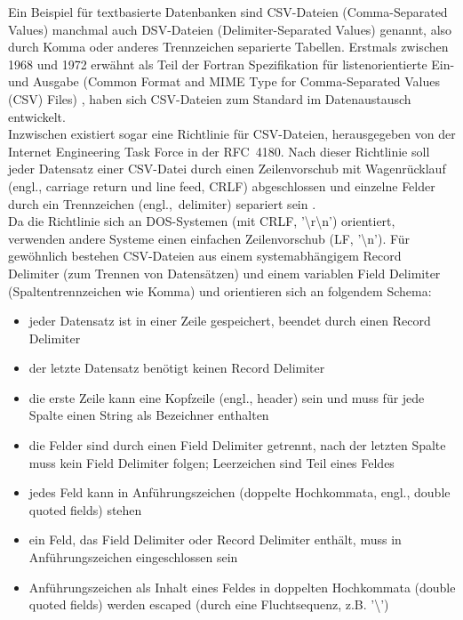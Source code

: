 
Ein Beispiel für textbasierte Datenbanken sind CSV-Dateien (Comma-Separated Values) manchmal auch DSV-Dateien (Delimiter-Separated Values) genannt, also durch Komma oder anderes Trennzeichen separierte Tabellen. Erstmals zwischen 1968 und 1972 erwähnt als Teil der Fortran Spezifikation für listenorientierte Ein- und Ausgabe (Common Format and MIME Type for Comma-Separated Values (CSV) Files) \cite[S. 17]{IBM_Fortran}, haben sich CSV-Dateien zum Standard im Datenaustausch entwickelt.\\

Inzwischen existiert sogar eine Richtlinie für CSV-Dateien, herausgegeben von der Internet Engineering Task Force in der RFC\ 4180. Nach dieser Richtlinie soll jeder Datensatz einer CSV-Datei durch einen Zeilenvorschub mit Wagenrücklauf (engl., carriage return und line feed, CRLF) abgeschlossen und einzelne Felder durch ein Trennzeichen (engl.,\ delimiter) separiert sein \cite{RFC}.\\

Da die Richtlinie sich an DOS-Systemen (mit CRLF, '\textbackslash r\textbackslash n') orientiert, verwenden andere Systeme einen einfachen Zeilenvorschub (LF, '\textbackslash n'). Für gewöhnlich bestehen CSV-Dateien aus einem systemabhängigem Record Delimiter (zum Trennen von Datensätzen) und einem variablen Field Delimiter (Spaltentrennzeichen wie Komma) und orientieren sich an folgendem Schema:
\begin{itemize}
\item jeder Datensatz ist in einer Zeile gespeichert, beendet durch einen Record Delimiter
\item der letzte Datensatz benötigt keinen Record Delimiter
\item die erste Zeile kann eine Kopfzeile (engl., header) sein und muss für jede Spalte einen String als Bezeichner enthalten
\item die Felder sind durch einen Field Delimiter getrennt, nach der letzten Spalte muss kein Field Delimiter folgen; Leerzeichen sind Teil eines Feldes
\item jedes Feld kann in Anführungszeichen (doppelte Hochkommata, engl., double quoted fields) stehen
\item ein Feld, das Field Delimiter oder Record Delimiter enthält, muss in Anführungszeichen eingeschlossen sein
\item Anführungszeichen als Inhalt eines Feldes in doppelten Hochkommata (double quoted fields) werden escaped (durch eine Fluchtsequenz, z.B. '\textbackslash ')
\end{itemize}


